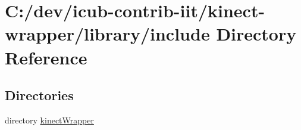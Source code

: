 \section{C\+:/dev/icub-\/contrib-\/iit/kinect-\/wrapper/library/include Directory Reference}
\label{dir_9bb0cdb2fc6936e925cffa69d90b0c80}
\subsection*{Directories}
\begin{DoxyCompactItemize}
\item 
directory \hyperlink{dir_1caf105552615038a067a5e0b3628349}{kinect\+Wrapper}
\end{DoxyCompactItemize}
